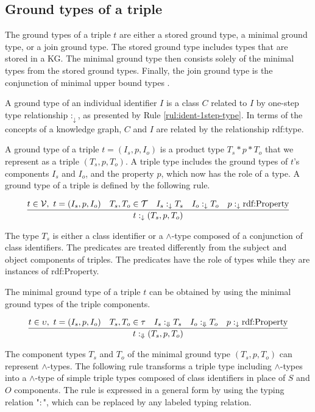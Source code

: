 \documentclass[runningheads]{llncs}
\newcommand{\darr}{\downarrow}
\newcommand{\Darr}{\Downarrow}
\newcommand{\V}{{\cal V}}
\newcommand{\T}{{\cal T}}
\begin{document}
\subsection{Ground types of a triple\label{sec:3-ground-types}}

\noindent
The ground types of a triple $t$ are either a stored ground type, a
minimal ground type, or a join ground type. The stored ground type
includes types that are stored in a KG. The minimal ground type then
consists solely of the minimal types from the stored ground
types. Finally, the join ground type is the conjunction of minimal
upper bound types \cite{Knudstorp2024}.
 
A ground type of an individual identifier $I$ is a class $C$ related
to $I$ by one-step type relationship $:_\darr$, as presented by Rule
\ref{rul:ident-1step-type}. In terms of the concepts of a knowledge
graph, $C$ and $I$ are related by the relationship rdf:type.

A ground type of a triple $t=(I_s,p,I_o)$ is a product type
$T_s*p*T_o$ that we represent as a triple $(T_s,p,T_o)$. A triple type
includes the ground types of $t$'s components $I_s$ and $I_o$, and the
property $p$, which now has the role of a type. A ground type of a
triple is defined by the following rule.

\begin{equation}
\label{rul:3-ground}
\dfrac{t\in\V,\ t=(I_s,p,I_o)\quad T_s,T_o\in\T\quad I_s:_\darr\/T_s\quad I_o:_\darr\/T_o\quad p:_\darr\text{rdf:Property}}
      {t:_\darr(T_s,p,T_o)}
\end{equation}

The type $T_s$ is either a class identifier or a $\land$-type composed
of a conjunction of class identifiers. The predicates are treated
differently from the subject and object components of triples. The
predicates have the role of types while they are instances of
rdf:Property.

The minimal ground type of a triple $t$ can be obtained by using the
minimal ground types of the triple components. 

\begin{equation}
\label{rul:3-min-ground}
\dfrac{t\in\upsilon,\ t=(I_s,p,I_o)\quad T_s,T_o\in\tau\quad I_s:_\Darr\/T_s\quad I_o:_\Darr\/T_o\quad p:_\darr\text{rdf:Property}}
      {t:_\Darr\/(T_s,p,T_o)}
\end{equation}

The component types $T_s$ and $T_o$ of the minimal ground type
$(T_s,p,T_o)$ can represent $\land$-types. The following rule transforms
a triple type including $\land$-types into a $\land$-type of simple
triple types composed of class identifiers in place of $S$ and $O$
components. The rule is expressed in a general form by using the
typing relation "$:$", which can be replaced by any labeled typing
relation.
\end{document}

